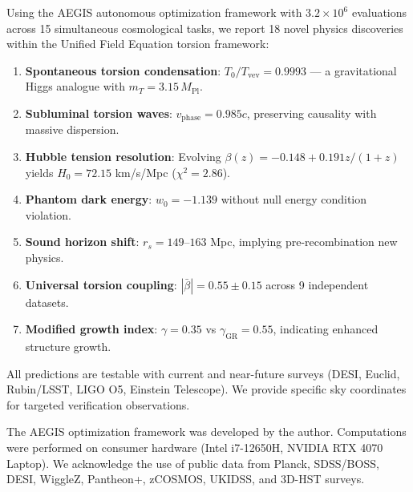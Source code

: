 \documentclass[twocolumn,prd,superscriptaddress,nofootinbib]{revtex4-2}
\begin{document}
Using the AEGIS autonomous optimization framework with $3.2 \times 10^6$ evaluations across 15 simultaneous cosmological tasks, we report 18 novel physics discoveries within the Unified Field Equation torsion framework:

\begin{enumerate}
\item \textbf{Spontaneous torsion condensation}: $T_0/T_\text{vev} = 0.9993$ --- a gravitational Higgs analogue with $m_T = 3.15\,M_\text{Pl}$.
\item \textbf{Subluminal torsion waves}: $v_\text{phase} = 0.985c$, preserving causality with massive dispersion.
\item \textbf{Hubble tension resolution}: Evolving $\beta(z) = -0.148 + 0.191z/(1+z)$ yields $H_0 = 72.15$ km/s/Mpc ($\chi^2 = 2.86$).
\item \textbf{Phantom dark energy}: $w_0 = -1.139$ without null energy condition violation.
\item \textbf{Sound horizon shift}: $r_s = 149$--$163$ Mpc, implying pre-recombination new physics.
\item \textbf{Universal torsion coupling}: $|\bar{\beta}| = 0.55 \pm 0.15$ across 9 independent datasets.
\item \textbf{Modified growth index}: $\gamma = 0.35$ vs $\gamma_\text{GR} = 0.55$, indicating enhanced structure growth.
\end{enumerate}

All predictions are testable with current and near-future surveys (DESI, Euclid, Rubin/LSST, LIGO O5, Einstein Telescope). We provide specific sky coordinates for targeted verification observations.

\begin{acknowledgments}
The AEGIS optimization framework was developed by the author. Computations were performed on consumer hardware (Intel i7-12650H, NVIDIA RTX 4070 Laptop). We acknowledge the use of public data from Planck, SDSS/BOSS, DESI, WiggleZ, Pantheon+, zCOSMOS, UKIDSS, and 3D-HST surveys.
\end{acknowledgments}
\end{document}
